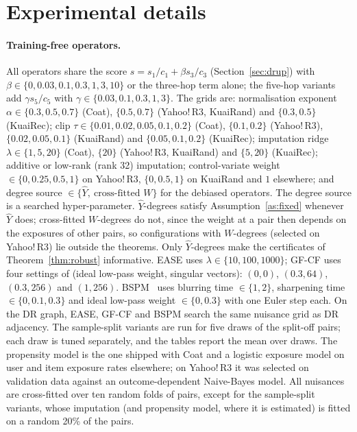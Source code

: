 \section{Experimental details}\label{app:details}

\paragraph{Training-free operators.}
All operators share the score $s=s_1/c_1+\beta s_3/c_3$ (Section~\ref{sec:drup}) with
$\beta\in\{0,0.03,0.1,0.3,1,3,10\}$ or the three-hop term alone; the five-hop
variants add $\gamma s_5/c_5$ with $\gamma\in\{0.03,0.1,0.3,1,3\}$. The grids are:
normalisation exponent $\alpha\in\{0.3,0.5,0.7\}$ (Coat), $\{0.5,0.7\}$
(Yahoo!\,R3, KuaiRand) and $\{0.3,0.5\}$ (KuaiRec); clip
$\tau\in\{0.01,0.02,0.05,0.1,0.2\}$ (Coat), $\{0.1,0.2\}$ (Yahoo!\,R3),
$\{0.02,0.05,0.1\}$ (KuaiRand) and $\{0.05,0.1,0.2\}$ (KuaiRec); imputation ridge
$\lambda\in\{1,5,20\}$ (Coat), $\{20\}$ (Yahoo!\,R3, KuaiRand) and $\{5,20\}$
(KuaiRec); additive or low-rank (rank 32) imputation; control-variate weight
$\in\{0,0.25,0.5,1\}$ on Yahoo!\,R3, $\{0,0.5,1\}$ on KuaiRand and $1$ elsewhere; and degree source $\in\{\hat Y,\ \text{cross-fitted }W\}$ for
the debiased operators. The degree source is a searched hyper-parameter.
$\hat Y$-degrees satisfy Assumption~\ref{as:fixed} whenever $\hat Y$ does;
cross-fitted $W$-degrees do not, since the weight at a pair then depends on
the exposures of other pairs, so configurations with $W$-degrees (selected on
Yahoo!\,R3) lie outside the theorems. Only $\hat Y$-degrees make the
certificates of Theorem~\ref{thm:robust} informative. EASE uses
$\lambda\in\{10,100,1000\}$; GF-CF uses four settings of (ideal low-pass weight, singular vectors):
$(0,0)$, $(0.3,64)$, $(0.3,256)$ and $(1,256)$. BSPM~\cite{choi2023bspm} uses blurring time
$\in\{1,2\}$, sharpening time $\in\{0,0.1,0.3\}$ and ideal low-pass weight
$\in\{0,0.3\}$ with one Euler step each. On the DR graph, EASE, GF-CF and BSPM
search the same nuisance grid as DR adjacency. The sample-split variants are
run for five draws of the split-off pairs; each draw is tuned separately, and
the tables report the mean over draws. The propensity model is
the one shipped with Coat and a logistic exposure model on user and item
exposure rates elsewhere; on Yahoo!\,R3 it was selected on validation data
against an outcome-dependent Naive-Bayes model. All nuisances are cross-fitted
over ten random folds of pairs, except for the sample-split variants, whose
imputation (and propensity model, where it is estimated) is fitted on a random
20\% of the pairs.

